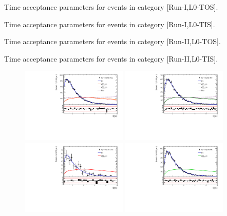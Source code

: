  
\begin{table}[h]
\centering
\scriptsize
\caption{Time acceptance parameters for events in category [\textsf{Run-I},\textsf{L0-TOS}].}

\label{table:splines}
\caption{Time acceptance parameters for events in category [\textsf{Run-I},\textsf{L0-TIS}].}

\caption{Time acceptance parameters for events in category [\textsf{Run-II},\textsf{L0-TOS}].}

\caption{Time acceptance parameters for events in category [\textsf{Run-II},\textsf{L0-TIS}].}

\label{table:splines4}
\end{table}

\clearpage
\begin{figure}[h]
\centering
\includegraphics[height=!,width=0.45\textwidth]{figs/Acceptance/adaptive_N4/timeAccRatioFit_norm_Run1_t0.pdf}
\includegraphics[height=!,width=0.45\textwidth]{figs/Acceptance/adaptive_N4/timeAccRatioFit_norm_mc_Run1_t0.pdf}
\includegraphics[height=!,width=0.45\textwidth]{figs/Acceptance/adaptive_N4/timeAccRatioFit_signal_B0_Run1_t0.pdf}
\includegraphics[height=!,width=0.45\textwidth]{figs/Acceptance/adaptive_N4/timeAccRatioFit_signal_mc_Run1_t0.pdf}

\end{figure}
